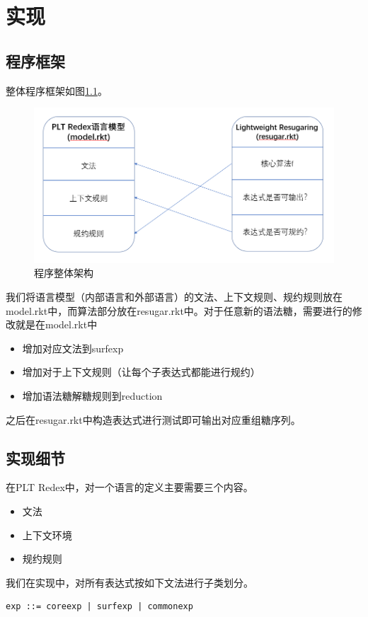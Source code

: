 \pagestyle{fancy}
\normalsize
\linespread{1.5}\selectfont
\label{mark:chapter5}\chapter{实现}

\section{程序框架}
整体程序框架如图\ref{fig:struct}。

\begin{figure}[h]
	\centering
	\includegraphics[width=12cm]{images/chapter5/structure.png}
	\caption{程序整体架构}
	\label{fig:struct}
\end{figure}

我们将语言模型（内部语言和外部语言）的文法、上下文规则、规约规则放在model.rkt中，而算法部分放在resugar.rkt中。对于任意新的语法糖，需要进行的修改就是在model.rkt中
\begin{itemize}
	\item 增加对应文法到surfexp
	\item 增加对于上下文规则（让每个子表达式都能进行规约）
	\item 增加语法糖解糖规则到reduction
\end{itemize}
之后在resugar.rkt中构造表达式进行测试即可输出对应重组糖序列。
\section{实现细节}
在PLT Redex中，对一个语言的定义主要需要三个内容。
\begin{itemize}
	\item 文法
	\item 上下文环境
	\item 规约规则
\end{itemize}

我们在实现中，对所有表达式按如下文法进行子类划分。
\begin{verbatim}
exp ::= coreexp | surfexp | commonexp
\end{verbatim}


